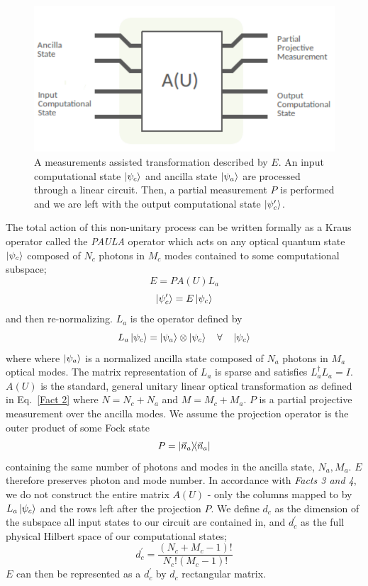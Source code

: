 \documentclass[aps,pra,twocolumn,showpacs,superscriptaddress,floatfix,10pt]{revtex4}
\begin{document}
 \begin{figure}[h]
 	\centering
 	\includegraphics[width=0.5 \textwidth]{./PAULA.pdf}
 	\caption{A measurements assisted transformation described by $E$. An input computational state $\ket{\psi_c}$ and ancilla state $\ket{\psi_a}$ are processed through a linear circuit. Then, a partial measurement $P$ is performed and we are left with the output computational state $\ket{\psi_c^\prime}$.}
 	\label{Figure - PAULA Operator}
 \end{figure}
The total action of this non-unitary process can be written formally as a Kraus operator called the \textit{PAULA} operator which acts on any optical quantum state $\ket{\psi_{c}}$ composed of $N_c$ photons in $M_c$ modes contained to some computational subspace;
\begin{equation}
\label{Kraus Paula Operator}
E = P A(U) L_a
\end{equation} 
\begin{equation}
\ket{\psi_{c}^\prime} = E \ket{\psi_{c}}
\end{equation}
and then re-normalizing.  $L_a$ is the operator defined by
\begin{equation}
\label{Ancilla Linker}
L_a \ket{\psi_{c}} = \ket{\psi_a} \otimes \ket{\psi_{c}} \quad  \forall \quad \ket{\psi_{c}}
\end{equation}
where where $\ket{\psi_a}$ is a normalized ancilla state composed of $N_a$ photons in $M_a$ optical modes. The matrix representation of $L_a$ is sparse and satisfies $L_a^\dagger L_a = I$.
$A(U)$ is the standard, general unitary linear optical transformation as defined in Eq.~\ref{Fact 2} where $N=N_c+N_a$ and $M=M_c+M_a$. $P$ is a partial projective measurement over the ancilla modes. We assume the projection operator is the outer product of some Fock state
\begin{equation}
P = \outerproduct{\vec{n}_a}{\vec{n}_a}
\end{equation}
containing the same number of photons and modes in the ancilla state, $N_a,M_a$. $E$ therefore preserves photon and mode number. In accordance with \textit{Facts 3 and 4}, we do not construct the entire matrix $A(U)$ - only the columns mapped to by $L_a \ket{\psi_{c}}$ and the rows left after the projection $P$. We define $d_c$ as the dimension of the subspace all input states to our circuit are contained in, and $d_c^\prime$ as the full physical Hilbert space of our computational states;
\begin{equation}
	d_c^\prime = \frac{(N_c+M_c-1)!}{N_c! (M_c-1)!}
\end{equation}
$E$ can then be represented as a $d_c^\prime$ by $d_c$ rectangular matrix.
\end{document}
